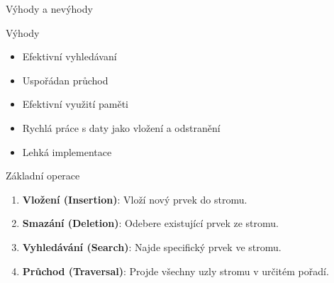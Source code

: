 \documentclass{beamer}
\begin{document}
\begin{frame}{Výhody a nevýhody}
    \begin{block}{Výhody}
        \begin{itemize}
            \item Efektivní vyhledávaní
            \item Uspořádan průchod
            \item Efektivní využití paměti
            \item Rychlá práce s daty jako vložení a odstranění
            \item Lehká implementace
        \end{itemize}
    \end{block}
\end{frame}

\begin{frame}{Základní operace}
    \begin{enumerate}
        \item \textbf{Vložení (Insertion)}: Vloží nový prvek do stromu.
        \item \textbf{Smazání (Deletion)}: Odebere existující prvek ze stromu.
        \item \textbf{Vyhledávání (Search)}: Najde specifický prvek ve stromu.
        \item \textbf{Průchod (Traversal)}: Projde všechny uzly stromu v určitém pořadí.
    \end{enumerate}
\end{frame}
\end{document}
